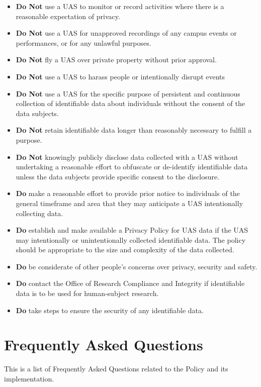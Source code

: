 \documentclass[
]{book}
\providecommand{\tightlist}{%
  \setlength{\itemsep}{0pt}\setlength{\parskip}{0pt}}
\begin{document}
\begin{itemize}
\tightlist
\item
  \textbf{Do Not} use a UAS to monitor or record activities where there is a reasonable expectation of privacy.
\item
  \textbf{Do Not} use a UAS for unapproved recordings of any campus events or performances, or for any unlawful purposes.
\item
  \textbf{Do Not} fly a UAS over private property without prior approval.
\item
  \textbf{Do Not} use a UAS to harass people or intentionally disrupt events
\item
  \textbf{Do Not} use a UAS for the specific purpose of persistent and continuous collection of identifiable data about individuals without the consent of the data subjects.
\item
  \textbf{Do Not} retain identifiable data longer than reasonably necessary to fulfill a purpose.
\item
  \textbf{Do Not} knowingly publicly disclose data collected with a UAS without undertaking a reasonable effort to obfuscate or de-identify identifiable data unless the data subjects provide specific consent to the disclosure.
\item
  \textbf{Do} make a reasonable effort to provide prior notice to individuals of the general timeframe and area that they may anticipate a UAS intentionally collecting data.
\item
  \textbf{Do} establish and make available a Privacy Policy for UAS data if the UAS may intentionally or unintentionally collected identifiable data. The policy should be appropriate to the size and complexity of the data collected.
\item
  \textbf{Do} be considerate of other people's concerns over privacy, security and safety.
\item
  \textbf{Do} contact the Office of Research Compliance and Integrity if identifiable data is to be used for human-subject research.
\item
  \textbf{Do} take steps to ensure the security of any identifiable data.
\end{itemize}

\hypertarget{ch-FAQs}{%
\chapter{Frequently Asked Questions}\label{ch-FAQs}}

This is a list of Frequently Asked Questions related to the Policy and its implementation.
\end{document}

